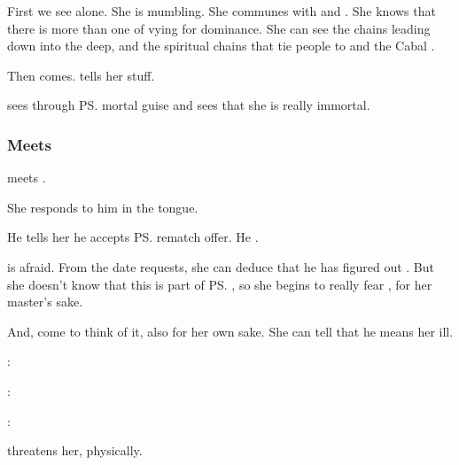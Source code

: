 \begin{garbage}
First we see \Uswa{} alone. 
She is mumbling. 
She communes with  and . 
She knows that there is more than one  of  vying for dominance. 
She can see the chains leading down into the deep, and the spiritual chains that tie people to \Nyx{} and the Cabal \Matrix. 

Then \Criseis{} comes. 
\Uswa{} tells her stuff. 

\Uswa{} sees through \ps{\Criseis} mortal guise and sees that she is really immortal. 





\subsubsection{Meets \Teshrial}
\Teshrial{} meets \Criseis. 

She responds to him in the \Resphan{} tongue. 

He tells her he accepts {\ps{\Ishnaruchaefir} rematch offer}. 
He . 

\Criseis{} is afraid. 
From the date \Teshrial{} requests, she can deduce that he has figured out . 
But she doesn't know that this is part of \ps{\Ishnaruchaefir} , so she begins to really fear \Teshrial, for her master's sake. 

And, come to think of it, also for her own sake.
She can tell that he means her ill. 

\begin{prose}
  \Criseis: 
  
  \Teshrial: 
  
  \Criseis: 
\end{prose}

\Teshrial{} threatens her, physically.


\end{garbage}
